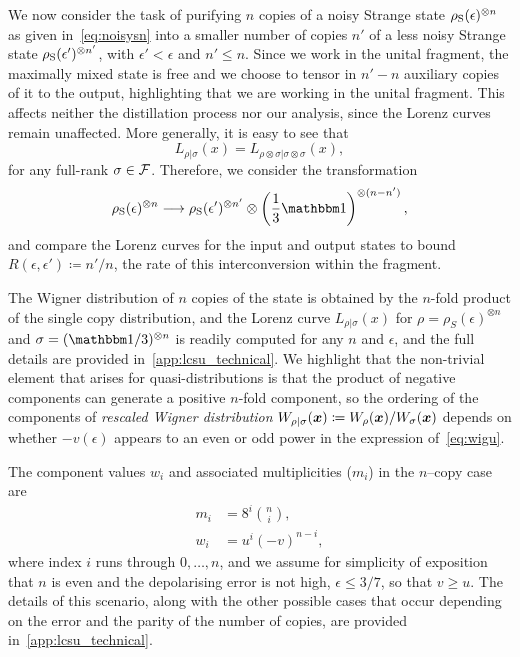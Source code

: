 \documentclass[pra,
aps,
twocolumn,
superscriptaddress,
groupedaddress,
nofootinbib,
reprint
]{revtex4-1}
\begin{document}
We now consider the task of purifying $n$ copies of a noisy Strange state $\rho_{\rm{S}}(\epsilon)^{\otimes n}$ as given in~\cref{eq:noisysn} into a smaller number of copies $n'$ of a less noisy Strange state $\rho_{\rm{S}}(\epsilon')^{\otimes n'}$, with $\epsilon' < \epsilon$ and $n' \leq n$. Since we work in the unital fragment, the maximally mixed state is free and we choose to tensor in $n'-n$ auxiliary copies of it to the output, highlighting that we are working in the unital fragment. This affects neither the distillation process nor our analysis, since the Lorenz curves remain unaffected. More generally, it is easy to see that
\begin{equation}
	L_{\rho |\sigma} (x) = L_{\rho \otimes \sigma |\sigma \otimes \sigma}(x),
\end{equation}
for any full-rank $\sigma \in {\mathcal F}$. Therefore, we consider the transformation
\begin{equation}\label{eq:sudist}
	\rho_{\rm{S}}(\epsilon)^{\otimes n} \longrightarrow \rho_{\rm{S}}(\epsilon')^{\otimes n'} \otimes \left( \frac{1}{3}\id \right)^{\otimes (n-n')},
\end{equation}
and compare the Lorenz curves for the input and output states to bound $R(\epsilon, \epsilon') \coloneqq n'/n$, the rate of this interconversion within the fragment.

The Wigner distribution of $n$ copies of the state is obtained by the $n$-fold product of the single copy distribution, and the Lorenz curve $L_{\rho|\sigma}(x)$ for $\rho = \rho_S(\epsilon)^{\otimes n}$ and $\sigma = (\I/3)^{\otimes n}$ is readily computed for any $n$ and $\epsilon$, and the full details are provided in~\cref{app:lcsu_technical}.
We highlight that the non-trivial element that arises for quasi-distributions is that the product of negative components can generate a positive $n$-fold component, so the ordering of the components of \emph{rescaled Wigner distribution} $W_{\rho |\sigma}(\bm{x}) \coloneqq W_{\rho}(\bm{x})/W_{\sigma}(\bm{x})$ depends on whether $-v(\epsilon)$ appears to an even or odd power in the expression of~\cref{eq:wigu}.

The component values $w_i$ and associated multiplicities ($m_i$) in the $n$--copy case are 
\begin{align}
	m_i &= 8^{i}\binom{n}{i}, \\
	w_i &= u^{i}(-v)^{n-i}, \label{eq:wigu}
\end{align}
where index $i$ runs through $0, \dots, n$, and we assume for simplicity of exposition that $n$ is even and the depolarising error is not high, $\epsilon \leq 3/7$, so that $v \geq u$.
The details of this scenario, along with the other possible cases that occur depending on the error and the parity of the number of copies, are provided in~\cref{app:lcsu_technical}.
\end{document}
